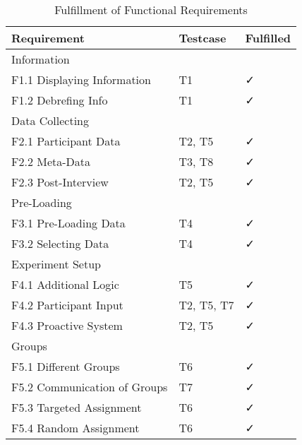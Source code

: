 \begin{table}
    \centering
    \small
    \begin{tabular}{L{0.35\textwidth}C{0.19\textwidth}C{0.19\textwidth}}
    \hline
    Requirement                     & Testcase & Fulfilled \\ \hline
    Information                     &   &          \\ \hline
    F1.1 Displaying Information     &  T1 &  \faCheck         \\
    F1.2 Debrefing Info             & T1 &  \faCheck      \\\hline
    Data Collecting             &   &            \\ \hline
    F2.1 Participant Data           & T2, T5 &   \faCheck       \\
    F2.2 Meta-Data                  &  T3, T8 &  \faCheck        \\
    F2.3 Post-Interview             & T2, T5 &   \faCheck       \\\hline
    Pre-Loading                 &  &            \\ \hline
    F3.1 Pre-Loading Data           & T4 & \faCheck        \\
    F3.2 Selecting Data             & T4 &  \faCheck       \\\hline
    Experiment Setup            &    &         \\ \hline
    F4.1 Additional Logic           & T5 & \faCheck       \\
    F4.2 Participant Input          & T2, T5, T7 &  \faCheck         \\
    F4.3 Proactive System           & T2, T5 &   \faCheck      \\\hline
    Groups                      & &            \\ \hline
    F5.1 Different Groups           & T6 &  \faCheck    \\
    F5.2 Communication of Groups    & T7  & \faCheck     \\ 
    F5.3 Targeted Assignment        & T6 & \faCheck \\
    F5.4 Random Assignment          & T6 & \faCheck \\ \hline
    \end{tabular}
    \caption[Fulfillment of Functional Requirements]{Fulfillment of Functional Requirements}\label{tab:FuncRequirementsCatCheck}
    \end{table}

